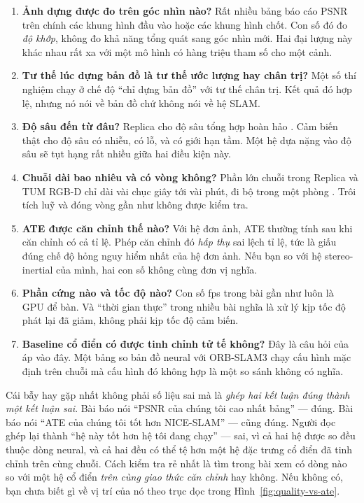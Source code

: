 \documentclass[../../deep_learning.tex]{subfiles}
\begin{document}
\begin{enumerate}
\item \textbf{Ảnh dựng được đo trên góc nhìn nào?} Rất nhiều bảng báo cáo PSNR trên chính các khung hình đầu vào hoặc các khung hình chốt. Con số đó đo \emph{độ khớp}, không đo khả năng tổng quát sang góc nhìn mới. Hai đại lượng này khác nhau rất xa với một mô hình có hàng triệu tham số cho một cảnh.
\item \textbf{Tư thế lúc dựng bản đồ là tư thế ước lượng hay chân trị?} Một số thí nghiệm chạy ở chế độ ``chỉ dựng bản đồ'' với tư thế chân trị. Kết quả đó hợp lệ, nhưng nó nói về bản đồ chứ không nói về hệ SLAM.
\item \textbf{Độ sâu đến từ đâu?} Replica cho độ sâu tổng hợp hoàn hảo \cite{f32replica2019}. Cảm biến thật cho độ sâu có nhiễu, có lỗ, và có giới hạn tầm. Một hệ dựa nặng vào độ sâu sẽ tụt hạng rất nhiều giữa hai điều kiện này.
\item \textbf{Chuỗi dài bao nhiêu và có vòng không?} Phần lớn chuỗi trong Replica và TUM RGB-D chỉ dài vài chục giây tới vài phút, đi bộ trong một phòng \cite{sturm2012benchmark,f32scannet2017}. Trôi tích luỹ và đóng vòng gần như không được kiểm tra.
\item \textbf{ATE được căn chỉnh thế nào?} Với hệ đơn ảnh, ATE thường tính sau khi căn chỉnh có cả tỉ lệ. Phép căn chỉnh đó \emph{hấp thụ} sai lệch tỉ lệ, tức là giấu đúng chế độ hỏng nguy hiểm nhất của hệ đơn ảnh. Nếu bạn so với hệ stereo-inertial của mình, hai con số không cùng đơn vị nghĩa.
\item \textbf{Phần cứng nào và tốc độ nào?} Con số fps trong bài gần như luôn là GPU để bàn. Và ``thời gian thực'' trong nhiều bài nghĩa là xử lý kịp tốc độ phát lại đã giảm, không phải kịp tốc độ cảm biến.
\item \textbf{Baseline cổ điển có được tinh chỉnh tử tế không?} Đây là câu hỏi của  áp vào đây. Một bảng so bản đồ neural với ORB-SLAM3 chạy cấu hình mặc định trên chuỗi mà cấu hình đó không hợp là một so sánh không có nghĩa.
\end{enumerate}

\begin{cambay}
Cái bẫy hay gặp nhất không phải số liệu sai mà là \emph{ghép hai kết luận đúng thành một kết luận sai}. Bài báo nói ``PSNR của chúng tôi cao nhất bảng'' --- đúng. Bài báo nói ``ATE của chúng tôi tốt hơn NICE-SLAM'' --- cũng đúng. Người đọc ghép lại thành ``hệ này tốt hơn hệ tôi đang chạy'' --- sai, vì cả hai hệ được so đều thuộc dòng neural, và cả hai đều có thể tệ hơn một hệ đặc trưng cổ điển đã tinh chỉnh trên cùng chuỗi. Cách kiểm tra rẻ nhất là tìm trong bài xem có dòng nào so với một hệ cổ điển \emph{trên cùng giao thức căn chỉnh} hay không. Nếu không có, bạn chưa biết gì về vị trí của nó theo trục dọc trong Hình~\ref{fig:quality-vs-ate}.
\end{cambay}
\end{document}
